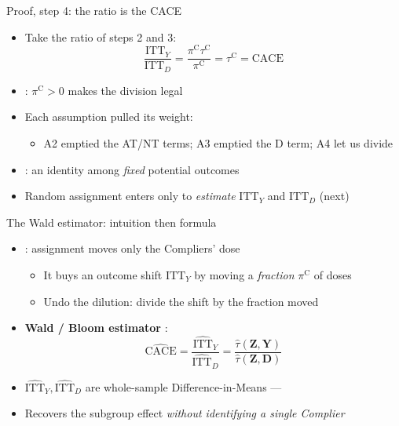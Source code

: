 \documentclass[table, xcolor = {dvipsnames}, 9pt]{beamer}
\theoremstyle{plain}
\newcommand{\mh}[1]{{\color{magenta}{#1}}}
\newcommand{\ITTY}{\mathrm{ITT}_Y}
\newcommand{\ITTD}{\mathrm{ITT}_D}
\newcommand{\CACE}{\mathrm{CACE}}
\newcommand{\hITTY}{\widehat{\mathrm{ITT}}_Y}
\newcommand{\hITTD}{\widehat{\mathrm{ITT}}_D}
\begin{document}
\begin{frame}[t]{Proof, step 4: the ratio is the CACE}
\vfill
\begin{itemize} \vfill
\item Take the ratio of steps 2 and 3: \vfill
\begin{equation*}
\frac{\ITTY}{\ITTD} = \frac{\pi^{\textrm{C}} \tau^{\textrm{C}}}{\pi^{\textrm{C}}} = \tau^{\textrm{C}} = \CACE
\end{equation*} \vfill
\item \mh{Existence of Compliers (A4)}: $\pi^{\textrm{C}} > 0$ makes the division legal \vfill
\item Each assumption pulled its weight: \vfill
\begin{itemize} \vfill
\item A2 emptied the AT/NT terms; A3 emptied the D term; A4 let us divide \vfill
\end{itemize} \vfill
\item \mh{No random assignment used}: an identity among \emph{fixed} potential outcomes \vfill
\item[] Random assignment enters only to \emph{estimate} $\ITTY$ and $\ITTD$ (next) \vfill
\end{itemize} \vfill
\end{frame}
\begin{frame}[t]{The Wald estimator: intuition then formula}
\vfill
\begin{itemize} \vfill
\item \mh{Intuition}: assignment moves only the Compliers' dose \vfill
\begin{itemize} \vfill
\item It buys an outcome shift $\ITTY$ by moving a \emph{fraction} $\pi^{\textrm{C}}$ of doses \vfill
\item Undo the dilution: divide the shift by the fraction moved \vfill
\end{itemize} \vfill
\item \textbf{Wald / Bloom estimator} \citep{bloom1984, angristetal1996}: \vfill
\begin{equation*}
\widehat{\CACE} = \frac{\hITTY}{\hITTD} = \frac{\hat{\tau}\left(\bm{Z}, \bm{Y}\right)}{\hat{\tau}\left(\bm{Z}, \bm{D}\right)}
\end{equation*} \vfill
\item $\hITTY, \hITTD$ are whole-sample Difference-in-Means --- \mh{no Complier labels} \vfill
\item[] Recovers the subgroup effect \emph{without identifying a single Complier} \vfill
\end{itemize} \vfill
\end{frame}
\end{document}
